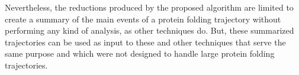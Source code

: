 \documentclass[american,twocolumn]{bmcart}
\begin{document}
Nevertheless, the reductions produced by the proposed algorithm are limited to create a summary of the main events of a protein folding trajectory without performing any kind of analysis, as other techniques do. But, these summarized trajectories can be used as input to these and other techniques that serve the same purpose and which were not designed to handle large protein folding trajectories.




\begin{backmatter}

\end{backmatter}
\end{document}
